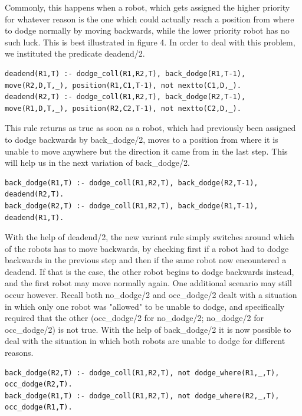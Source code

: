 \documentclass{llncs}
\begin{document}
Commonly, this happens when a robot, which gets assigned the higher priority for whatever reason is the one which could actually reach a position from where to dodge normally by moving backwards, while the lower priority robot has no such luck. This is best illustrated in figure 4.\newline
In order to deal with this problem, we instituted the predicate deadend/2.\newpage
\begin{lstlisting}[basicstyle=\fontsize{9}{11}\selectfont\ttfamily,frame=single,breaklines=true]
deadend(R1,T) :- dodge_coll(R1,R2,T), back_dodge(R1,T-1), move(R2,D,T,_), position(R1,C1,T-1), not nextto(C1,D,_).
deadend(R2,T) :- dodge_coll(R1,R2,T), back_dodge(R2,T-1), move(R1,D,T,_), position(R2,C2,T-1), not nextto(C2,D,_).
\end{lstlisting}
This rule returns as true as soon as a robot, which had previously been assigned to dodge backwards by back\_dodge/2, moves to a position from where it is unable to move anywhere but the direction it came from in the last step. This will help us in the next variation of back\_dodge/2.
\begin{lstlisting}[basicstyle=\fontsize{9}{11}\selectfont\ttfamily,frame=single,breaklines=true]
back_dodge(R1,T) :- dodge_coll(R1,R2,T), back_dodge(R2,T-1), deadend(R2,T).
back_dodge(R2,T) :- dodge_coll(R1,R2,T), back_dodge(R1,T-1), deadend(R1,T).
\end{lstlisting}
With the help of deadend/2, the new variant rule simply switches around which of the robots has to move backwards, by checking first if a robot had to dodge backwards in the previous step and then if the same robot now encountered a deadend. If that is the case, the other robot begins to dodge backwards instead, and the first robot may move normally again.\newline\newline
One additional scenario may still occur however. Recall both no\_dodge/2 and occ\_dodge/2 dealt with a situation in which only one robot was "allowed" to be unable to dodge, and specifically required that the other (occ\_dodge/2 for no\_dodge/2; no\_dodge/2 for occ\_dodge/2) is not true. With the help of back\_dodge/2 it is now possible to deal with the situation in which both robots are unable to dodge for different reasons.
\begin{lstlisting}[basicstyle=\fontsize{9}{11}\selectfont\ttfamily,frame=single,breaklines=true]
back_dodge(R2,T) :- dodge_coll(R1,R2,T), not dodge_where(R1,_,T), occ_dodge(R2,T).
back_dodge(R1,T) :- dodge_coll(R1,R2,T), not dodge_where(R2,_,T), occ_dodge(R1,T).
\end{lstlisting}
\end{document}
